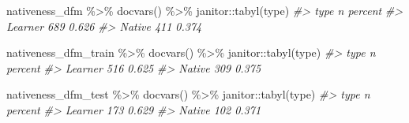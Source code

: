\documentclass[
]{article}
\newenvironment{Shaded}{\begin{snugshade}}{\end{snugshade}}
\newcommand{\CommentTok}[1]{\textcolor[rgb]{0.56,0.35,0.01}{\textit{#1}}}
\newcommand{\FunctionTok}[1]{\textcolor[rgb]{0.00,0.00,0.00}{#1}}
\newcommand{\NormalTok}[1]{#1}
\newcommand{\SpecialCharTok}[1]{\textcolor[rgb]{0.00,0.00,0.00}{#1}}
\begin{document}
\begin{Shaded}
\begin{Highlighting}[]
\NormalTok{nativeness\_dfm }\SpecialCharTok{\%\textgreater{}\%}
    \FunctionTok{docvars}\NormalTok{() }\SpecialCharTok{\%\textgreater{}\%}
\NormalTok{    janitor}\SpecialCharTok{::}\FunctionTok{tabyl}\NormalTok{(type)}
\CommentTok{\#\textgreater{}     type   n percent}
\CommentTok{\#\textgreater{}  Learner 689   0.626}
\CommentTok{\#\textgreater{}   Native 411   0.374}

\NormalTok{nativeness\_dfm\_train }\SpecialCharTok{\%\textgreater{}\%}
    \FunctionTok{docvars}\NormalTok{() }\SpecialCharTok{\%\textgreater{}\%}
\NormalTok{    janitor}\SpecialCharTok{::}\FunctionTok{tabyl}\NormalTok{(type)}
\CommentTok{\#\textgreater{}     type   n percent}
\CommentTok{\#\textgreater{}  Learner 516   0.625}
\CommentTok{\#\textgreater{}   Native 309   0.375}

\NormalTok{nativeness\_dfm\_test }\SpecialCharTok{\%\textgreater{}\%}
    \FunctionTok{docvars}\NormalTok{() }\SpecialCharTok{\%\textgreater{}\%}
\NormalTok{    janitor}\SpecialCharTok{::}\FunctionTok{tabyl}\NormalTok{(type)}
\CommentTok{\#\textgreater{}     type   n percent}
\CommentTok{\#\textgreater{}  Learner 173   0.629}
\CommentTok{\#\textgreater{}   Native 102   0.371}
\end{Highlighting}
\end{Shaded}
\end{document}
